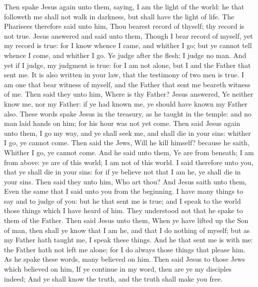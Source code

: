  Then spake Jesus again unto them, saying, I am the light
of the world: he that followeth me shall not walk in darkness, but shall
have the light of life.  The Pharisees therefore said
unto him, Thou bearest record of thyself; thy record is not true.
 Jesus answered and said unto them, Though I bear record
of myself, yet my record is true: for I know whence I came, and whither
I go; but ye cannot tell whence I come, and whither I go.
 Ye judge after the flesh; I judge no man.
 And yet if I judge, my judgment is true: for I am not
alone, but I and the Father that sent me.  It is also
written in your law, that the testimony of two men is true.
 I am one that bear witness of myself, and the Father
that sent me beareth witness of me.  Then said they unto
him, Where is thy Father? Jesus answered, Ye neither know me, nor my
Father: if ye had known me, ye should have known my Father also.
 These words spake Jesus in the treasury, as he taught in
the temple: and no man laid hands on him; for his hour was not yet come.
 Then said Jesus again unto them, I go my way, and ye
shall seek me, and shall die in your sins: whither I go, ye cannot come.
 Then said the Jews, Will he kill himself? because he
saith, Whither I go, ye cannot come.  And he said unto
them, Ye are from beneath; I am from above: ye are of this world; I am
not of this world.  I said therefore unto you, that ye
shall die in your sins: for if ye believe not that I am he, ye shall die
in your sins.  Then said they unto him, Who art thou? And
Jesus saith unto them, Even the same that I said unto you from the
beginning.  I have many things to say and to judge of
you: but he that sent me is true; and I speak to the world those things
which I have heard of him.  They understood not that he
spake to them of the Father.  Then said Jesus unto them,
When ye have lifted up the Son of man, then shall ye know that I am he,
and that I do nothing of myself; but as my Father hath taught me, I
speak these things.  And he that sent me is with me: the
Father hath not left me alone; for I do always those things that please
him.  As he spake these words, many believed on him.
 Then said Jesus to those Jews which believed on him, If
ye continue in my word, then are ye my disciples indeed; 
And ye shall know the truth, and the truth shall make you free.

